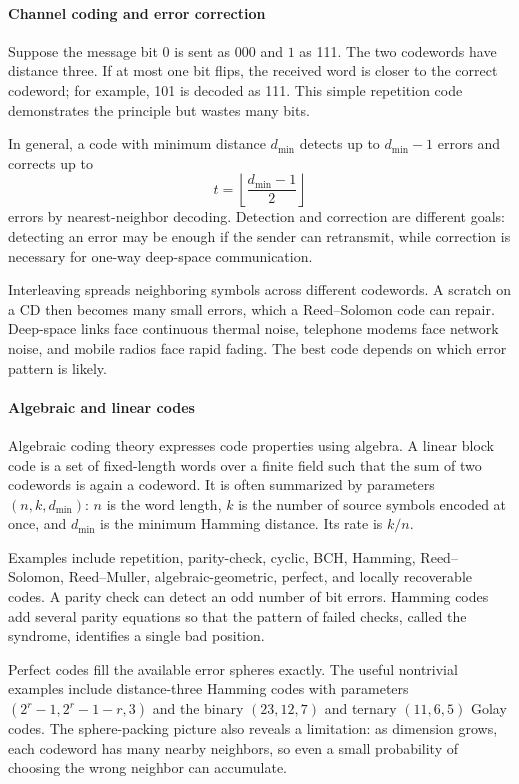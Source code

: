 \paragraph{Channel coding and error correction}

Suppose the message bit $0$ is sent as 000 and $1$ as 111. The two codewords have distance three. If at most one bit flips, the received word is closer to the correct codeword; for example, 101 is decoded as 111. This simple repetition code demonstrates the principle but wastes many bits.

In general, a code with minimum distance $d_{\min}$ detects up to $d_{\min}-1$ errors and corrects up to
\[
 t=\left\lfloor\frac{d_{\min}-1}{2}\right\rfloor
\]
errors by nearest-neighbor decoding. Detection and correction are different goals: detecting an error may be enough if the sender can retransmit, while correction is necessary for one-way deep-space communication.

Interleaving spreads neighboring symbols across different codewords. A scratch on a CD then becomes many small errors, which a Reed--Solomon code can repair. Deep-space links face continuous thermal noise, telephone modems face network noise, and mobile radios face rapid fading. The best code depends on which error pattern is likely. \cite{coding_theory_ref1,coding_theory_ref7}

\paragraph{Algebraic and linear codes}

Algebraic coding theory expresses code properties using algebra. A linear block code is a set of fixed-length words over a finite field such that the sum of two codewords is again a codeword. It is often summarized by parameters $(n,k,d_{\min})$: $n$ is the word length, $k$ is the number of source symbols encoded at once, and $d_{\min}$ is the minimum Hamming distance. Its rate is $k/n$.

Examples include repetition, parity-check, cyclic, BCH, Hamming, Reed--Solomon, Reed--Muller, algebraic-geometric, perfect, and locally recoverable codes. A parity check can detect an odd number of bit errors. Hamming codes add several parity equations so that the pattern of failed checks, called the syndrome, identifies a single bad position.

Perfect codes fill the available error spheres exactly. The useful nontrivial examples include distance-three Hamming codes with parameters $(2^r-1,2^r-1-r,3)$ and the binary $(23,12,7)$ and ternary $(11,6,5)$ Golay codes. The sphere-packing picture also reveals a limitation: as dimension grows, each codeword has many nearby neighbors, so even a small probability of choosing the wrong neighbor can accumulate. \cite{coding_theory_ref1,coding_theory_ref8}

